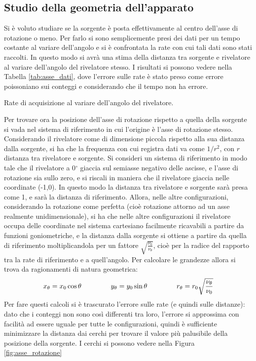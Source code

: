 \subsection{Studio della geometria dell'apparato}
Si è voluto studiare se la sorgente è posta effettivamente al centro dell'asse di rotazione o meno. Per farlo si sono semplicemente presi dei dati per un tempo
costante al variare dell'angolo e si è confrontata la rate con cui tali dati sono stati raccolti. In questo modo si avrà una stima della distanza tra sorgente e
rivelatore al variare dell'angolo del rivelatore stesso. I risultati si possono vedere nella Tabella \ref{tab:asse_dati}, dove l'errore sulle rate è stato preso
come errore poissoniano sui conteggi e considerando che il tempo non ha errore.
%
\begin{table}[h]
	\centering
	
	\caption{Rate di acquisizione al variare dell'angolo del rivelatore.}
	\label{tab:asse_dati}
\end{table}
%
Per trovare ora la posizione dell'asse di rotazione rispetto a quella della sorgente si vada nel sistema di riferimento in cui l'origine è l'asse di rotazione stesso.
Considerando il rivelatore come di dimensione piccola rispetto alla sua distanza dalla sorgente, si ha che la frequenza con cui registra dati va come $1/r^2$, con $r$ distanza
tra rivelatore e sorgente. Si consideri un sistema di riferimento in modo tale che il rivelatore a 0$^\circ$ giaccia sul semiasse negativo delle ascisse, e l'asse di
rotazione sia sullo zero, e si riscali in maniera che il rivelatore giaccia nelle coordinate (-1,0). In questo modo la distanza tra rivelatore e sorgente sarà presa come 1,
e sarà la distanza di riferimento. Allora, nelle altre configurazioni, considerando la rotazione come perfetta (cioè rotazione attorno ad un asse realmente unidimensionale),
si ha che nelle altre configurazioni il rivelatore occupa delle coordinate nel sistema cartesiano facilmente ricavabili a partire da funzioni goniometriche, e la distanza
dalla sorgente si ottiene a partire da quella di riferimento moltiplicandola per un fattore $\sqrt{\frac{\nu_0}{\nu_\theta}}$, cioè per la radice del rapporto tra la rate
di riferimento e a quell'angolo. Per calcolare le grandezze allora si trova da ragionamenti di natura geometrica:
$$ x_\theta = x_0 \cos \theta \hspace{1.5cm} y_\theta = y_0 \sin \theta \hspace{1.5cm} r_\theta = r_0 \sqrt{\frac{\nu_\theta}{\nu_0}}$$
Per fare questi calcoli si è trascurato l'errore sulle rate (e quindi sulle distanze): dato che i conteggi non sono così differenti tra loro, l'errore si approssima con facilità
ad essere uguale per tutte le configurazioni, quindi è sufficiente minimizzare la distanza dai cerchi per trovare il valore più palusibile della posizione della sorgente.
I cerchi si possono vedere nella Figura \ref{fig:asse_rotazione}\\


